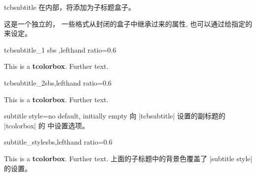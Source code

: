 \begin{docCommand}[doc new=2014-10-10]{tcbsubtitle}{}
在内部，将添加为子标题盒子。
  
这是一个独立的，%
一些格式从封闭的盒子中继承过来的属性,%
也可以通过给指定的来设定。
\begin{exdispExample*}{tcbsubtitle_1}{%
sbs%
,lefthand ratio=0.6%
}
\begin{tcolorbox}[title=我的标题,
colback=red!5!white,
colframe=red!75!black,
fonttitle=\bfseries]
  This is a \textbf{tcolorbox}.
  Further text.
\end{tcolorbox}
\end{exdispExample*}
\begin{exdispExample*}{tcbsubtitle_2}{sbs,lefthand ratio=0.6}
\begin{tcolorbox}[title=My title,
    colback=red!5!white,
    colframe=red!75!black,
    colbacktitle=yellow!50!red,
    coltitle=red!25!black,
    fonttitle=\bfseries]
  This is a \textbf{tcolorbox}.
  Further text.
\end{tcolorbox}
\end{exdispExample*}
\end{docCommand}

\begin{docTcbKey}[][doc new=2014-10-10]{subtitle style}{=}{no default, initially empty}
  向 |tcbsubtitle| 设置的副标题的 |tcolorbox| 的  中设置选项。

\begin{exdispExample*}{subtitle_style}{sbs,lefthand ratio=0.6}
\begin{tcolorbox}[title=My title,
  colback=red!5!white,
  colframe=red!75!black,
  colbacktitle=yellow!50!red,
  coltitle=red!25!black,
  fonttitle=\bfseries,
  subtitle style={boxrule=0.4pt,
    colback=yellow!50!red!25!white} ]
  This is a \textbf{tcolorbox}.
  Further text.
上面的子标题中的背景色覆盖了 |subtitle style| 的设置。
\end{tcolorbox}
\end{exdispExample*}
\end{docTcbKey}



